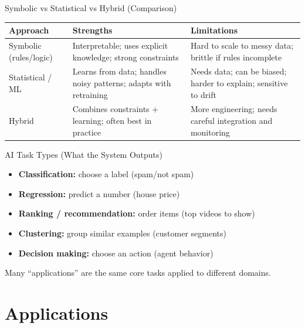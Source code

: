 \documentclass[aspectratio=169]{beamer}
\begin{document}
\begin{frame}{Symbolic vs Statistical vs Hybrid (Comparison)}
  \centering
  \begin{tabular}{p{3.4cm}p{4.3cm}p{4.3cm}}
    \toprule
    \textbf{Approach} & \textbf{Strengths} & \textbf{Limitations} \\
    \midrule
    Symbolic (rules/logic) &
    Interpretable; uses explicit knowledge; strong constraints &
    Hard to scale to messy data; brittle if rules incomplete \\
    \midrule
    Statistical / ML &
    Learns from data; handles noisy patterns; adapts with retraining &
    Needs data; can be biased; harder to explain; sensitive to drift \\
    \midrule
    Hybrid &
    Combines constraints + learning; often best in practice &
    More engineering; needs careful integration and monitoring \\
    \bottomrule
  \end{tabular}
\end{frame}

\begin{frame}{AI Task Types (What the System Outputs)}
  \begin{itemize}[<+->]
    \item \textbf{Classification:} choose a label (spam/not spam)
    \item \textbf{Regression:} predict a number (house price)
    \item \textbf{Ranking / recommendation:} order items (top videos to show)
    \item \textbf{Clustering:} group similar examples (customer segments)
    \item \textbf{Decision making:} choose an action (agent behavior)
  \end{itemize}
  \vspace{0.4em}
  Many ``applications'' are the same core tasks applied to different domains.
\end{frame}

\section{Applications}
\label{sec:apps}
\end{document}
